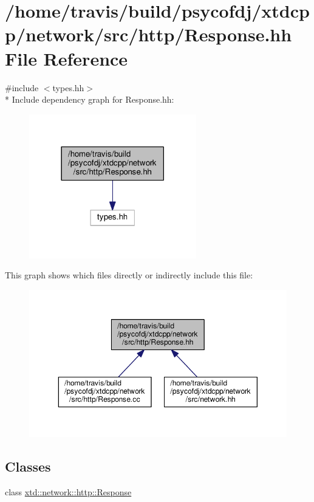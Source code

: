 \hypertarget{Response_8hh}{\section{/home/travis/build/psycofdj/xtdcpp/network/src/http/\-Response.hh File Reference}
\label{Response_8hh}
}
{\ttfamily \#include $<$types.\-hh$>$}\\*
Include dependency graph for Response.\-hh\-:
\nopagebreak
\begin{figure}[H]
\begin{center}
\leavevmode
\includegraphics[width=206pt]{Response_8hh__incl}
\end{center}
\end{figure}
This graph shows which files directly or indirectly include this file\-:
\nopagebreak
\begin{figure}[H]
\begin{center}
\leavevmode
\includegraphics[width=350pt]{Response_8hh__dep__incl}
\end{center}
\end{figure}
\subsection*{Classes}
\begin{DoxyCompactItemize}
\item 
class \hyperlink{classxtd_1_1network_1_1http_1_1Response}{xtd\-::network\-::http\-::\-Response}
\end{DoxyCompactItemize}
